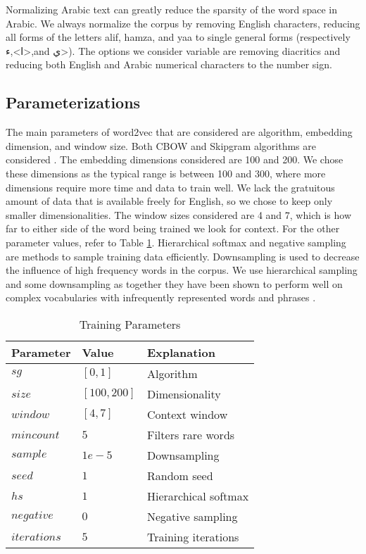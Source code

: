 Normalizing Arabic text can greatly reduce the sparsity of the word space in Arabic. We always normalize the corpus by removing English characters, reducing all forms of the letters alif, hamza, and yaa to single general forms (respectively \<ا>,\<ء>,and \<ي>).  The options we consider variable are removing diacritics and reducing both English and Arabic numerical characters to the number sign.

\subsection{Parameterizations}

The main parameters of word2vec that are considered are algorithm, embedding dimension, and window size. Both CBOW and Skipgram algorithms are considered \cite{mikoloveffic:2013}. The embedding dimensions considered are 100 and 200. We chose these dimensions as the typical range is between 100 and 300, where more dimensions require more time and data to train well. We lack the gratuitous amount of data that is available freely for English, so we chose to keep only smaller dimensionalities. The window sizes considered are 4 and 7, which is how far to either side of the word being trained we look for context. For the other parameter values, refer to Table \ref{table:params}. Hierarchical softmax and negative sampling are methods to sample training data efficiently. Downsampling is used to decrease the influence of high frequency words in the corpus. We use hierarchical sampling and some downsampling as together they have been shown to perform well on complex vocabularies with infrequently represented words and phrases \cite{mikolovdist:2013}.

\begin{table}
\begin{tabular}{l|l|l}
\textbf{Parameter} & \textbf{Value} & \textbf{Explanation} \\
\hline
$sg$ & $[0,1]$ & Algorithm \\
$size$ & $[100, 200]$ & Dimensionality \\
$window$ & $[4, 7]$ & Context window \\
$min count$ & $5$ & Filters rare words \\
$sample$ & $1e-5$ & Downsampling \\
$seed$ & $1$ & Random seed \\
$hs$ & $1$ & Hierarchical softmax \\
$negative$ & $0$ & Negative sampling \\
$iterations$ & $5$ & Training iterations \\
\end{tabular}
\caption{Training Parameters}
\label{table:params}
\end{table}